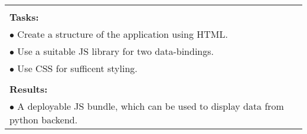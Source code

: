 \begin{table}[!h]
\begin{center}
\begin{tabular}{|p{}||p{}|p{}||p{}|}
            \multicolumn{4}{|p{.95\columnwidth}|}{}\\
            \multicolumn{4}{|p{.95\columnwidth}|}{\textbf{Tasks:}}\\
            \multicolumn{4}{|p{.95\columnwidth}|}{$\bullet$ Create a structure of the application using HTML.}\\
            \multicolumn{4}{|p{.95\columnwidth}|}{$\bullet$ Use a suitable JS library for two data-bindings.}\\
            \multicolumn{4}{|p{.95\columnwidth}|}{$\bullet$ Use CSS for sufficent styling.}\\

            \multicolumn{4}{|p{.95\columnwidth}|}{}\\
            \multicolumn{4}{|p{.95\columnwidth}|}{\textbf{Results:}}\\
            \multicolumn{4}{|p{.95\columnwidth}|}{$\bullet$ A deployable JS bundle, which can be used to display data from python backend.}\\
            \hline
        \end{tabular}
    \end{center}
\end{table}

\clearpage

